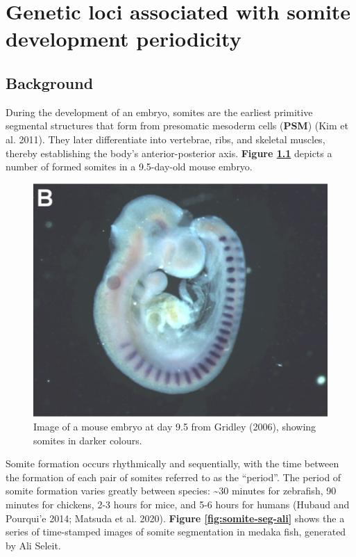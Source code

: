 \documentclass[
]{book}
\begin{document}
\hypertarget{Somite-chap}{%
\chapter{Genetic loci associated with somite development periodicity}\label{Somite-chap}}

\hypertarget{background}{%
\section{Background}\label{background}}

During the development of an embryo, somites are the earliest primitive segmental structures that form from presomatic mesoderm cells (\textbf{PSM}) (Kim et al. 2011). They later differentiate into vertebrae, ribs, and skeletal muscles, thereby establishing the body's anterior-posterior axis. \textbf{Figure \ref{fig:mouse-embryo}} depicts a number of formed somites in a 9.5-day-old mouse embryo.



\begin{figure}
\includegraphics[width=1\linewidth]{figs/somites/mouse_embryo_gridley} \caption{Image of a mouse embryo at day 9.5 from Gridley (2006), showing somites in darker colours.}\label{fig:mouse-embryo}
\end{figure}

Somite formation occurs rhythmically and sequentially, with the time between the formation of each pair of somites referred to as the ``period''. The period of somite formation varies greatly between species: \textasciitilde30 minutes for zebrafish, 90 minutes for chickens, 2-3 hours for mice, and 5-6 hours for humans (Hubaud and Pourqui'e 2014; Matsuda et al. 2020). \textbf{Figure \ref{fig:somite-seg-ali}} shows the a series of time-stamped images of somite segmentation in medaka fish, generated by Ali Seleit.
\end{document}

